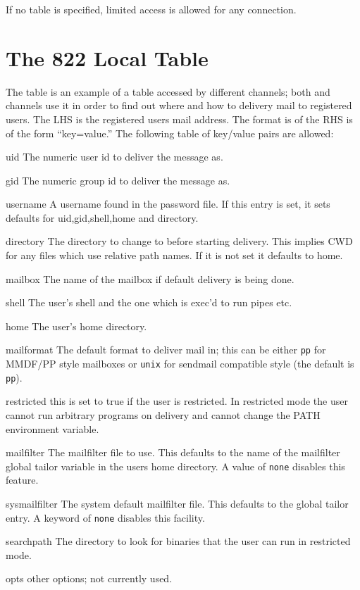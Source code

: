 If no table is specified, limited access is allowed for any
connection.

\section {The 822 Local Table}
\label{sect:local}

The  table is an example of a table
accessed by different channels; both  and  
channels use it in order to find out where and how to delivery mail to
registered users.
The LHS is the registered users mail address.
The format is of the RHS is of the form ``key=value.'' 
The following table of key/value pairs
are allowed:
\begin{describe}
\item[uid]
The numeric user id to deliver the message as.
\item[gid] The numeric group id to deliver the message as.
\item[username] A username found in the password file. If this
entry is set, it sets defaults for uid,gid,shell,home and directory.
\item[directory] The directory to change to before starting delivery.
This implies CWD for any files which use relative path names.
If it is not set it defaults to home.
\item[mailbox] The name of the mailbox if default delivery is being
done.
\item[shell]	The user's shell and the one which is exec'd to run
pipes etc.
\item[home] The user's home directory.
\item[mailformat] The default format to deliver mail in; this can be
either \verb|pp| for MMDF/PP style mailboxes or \verb|unix| for
sendmail compatible style (the default is \verb|pp|).
\item[restricted] this is set to true if the user is restricted. In
restricted mode the user cannot run arbitrary programs on delivery and
cannot change the PATH environment variable.
\item[mailfilter] The mailfilter file to use. This defaults to the
name of the mailfilter global tailor variable in the users home
directory. A value of \verb|none| disables this feature.
\item[sysmailfilter] The system default mailfilter file. This defaults
to the global tailor entry. A keyword of \verb|none| disables this facility.
\item[searchpath] The directory to look for binaries that the user can
run in restricted mode.
\item[opts] other options; not currently used.
\end{describe}
